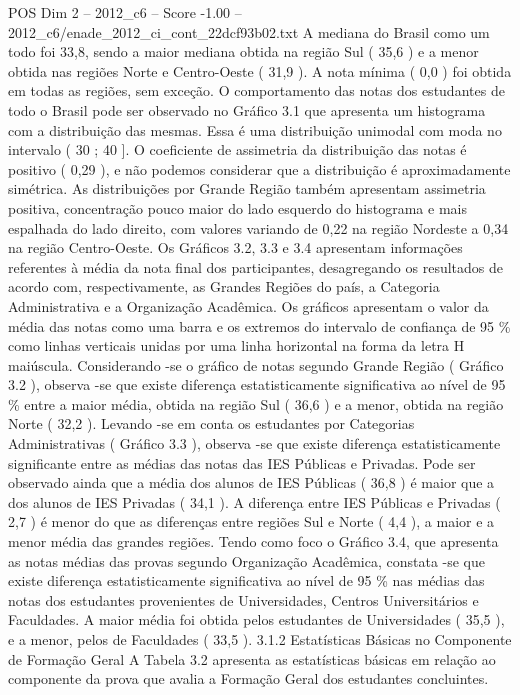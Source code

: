 \begin{textsample}{POS Dim 2 – 2012\_c6 – Score -1.00 – 2012\_c6/enade\_2012\_ci\_cont\_22dcf93b02.txt}
A mediana do Brasil como um todo foi 33,8, sendo a maior mediana obtida na região Sul ( 35,6 ) e a menor obtida nas regiões Norte e Centro-Oeste ( 31,9 ).
A nota mínima ( 0,0 ) foi obtida em todas as regiões, sem exceção.
O comportamento das notas dos estudantes de todo o Brasil pode ser observado no Gráfico 3.1 que apresenta um histograma com a distribuição das mesmas.
Essa é uma distribuição unimodal com moda no intervalo ( 30 ; 40 ].
O coeficiente de assimetria da distribuição das notas é positivo ( 0,29 ), e não podemos considerar que a distribuição é aproximadamente simétrica.
As distribuições por Grande Região também apresentam assimetria positiva, concentração pouco maior do lado esquerdo do histograma e mais espalhada do lado direito, com valores variando de 0,22 na região Nordeste a 0,34 na região Centro-Oeste.
Os Gráficos 3.2, 3.3 e 3.4 apresentam informações referentes à média da nota final dos participantes, desagregando os resultados de acordo com, respectivamente, as Grandes Regiões do país, a Categoria Administrativa e a Organização Acadêmica.
Os gráficos apresentam o valor da média das notas como uma barra e os extremos do intervalo de confiança de 95 \% como linhas verticais unidas por uma linha horizontal na forma da letra H maiúscula.
Considerando -se o gráfico de notas segundo Grande Região ( Gráfico 3.2 ), observa -se que existe diferença estatisticamente significativa ao nível de 95 \% entre a maior média, obtida na região Sul ( 36,6 ) e a menor, obtida na região Norte ( 32,2 ).
Levando -se em conta os estudantes por Categorias Administrativas ( Gráfico 3.3 ), observa -se que existe diferença estatisticamente significante entre as médias das notas das IES Públicas e Privadas.
Pode ser observado ainda que a média dos alunos de IES Públicas ( 36,8 ) é maior que a dos alunos de IES Privadas ( 34,1 ).
A diferença entre IES Públicas e Privadas ( 2,7 ) é menor do que as diferenças entre regiões Sul e Norte ( 4,4 ), a maior e a menor média das grandes regiões.
Tendo como foco o Gráfico 3.4, que apresenta as notas médias das provas segundo Organização Acadêmica, constata -se que existe diferença estatisticamente significativa ao nível de 95 \% nas médias das notas dos estudantes provenientes de Universidades, Centros Universitários e Faculdades.
A maior média foi obtida pelos estudantes de Universidades ( 35,5 ), e a menor, pelos de Faculdades ( 33,5 ). 3.1.2 Estatísticas Básicas no Componente de Formação Geral A Tabela 3.2 apresenta as estatísticas básicas em relação ao componente da prova que avalia a Formação Geral dos estudantes concluintes.

\end{textsample}
